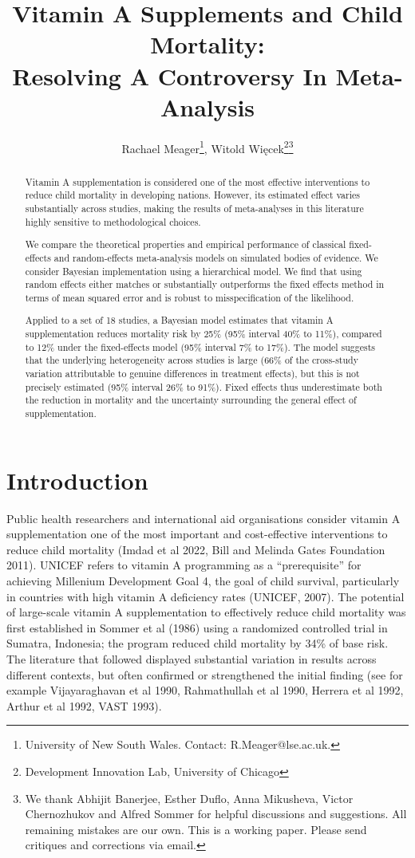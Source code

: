 \documentclass[12pt]{article}
\title{\Large Vitamin A Supplements and Child Mortality:\\ Resolving A Controversy In Meta-Analysis\\
}
\author{Rachael Meager\footnote{University of New South Wales. Contact: R.Meager@lse.ac.uk.}, Witold Więcek\footnote{Development Innovation Lab, University of Chicago}\;\thanks{We thank Abhijit Banerjee, Esther Duflo, Anna Mikusheva, Victor Chernozhukov and Alfred Sommer for helpful discussions and suggestions. All remaining mistakes are our own. This is a working paper. Please send critiques and corrections via email.  }}
\begin{document}
\maketitle

\begin{abstract}
Vitamin A supplementation is considered one of the most effective interventions to reduce child mortality in developing nations. However, its estimated effect varies substantially across studies, making the results of meta-analyses in this literature highly sensitive to methodological choices. 

We compare the theoretical properties and empirical performance of classical fixed-effects and  random-effects meta-analysis models on simulated bodies of evidence. We consider Bayesian implementation using a hierarchical model. We find that using random effects either matches or substantially outperforms the fixed effects method in terms of mean squared error and is robust to misspecification of the likelihood. 

Applied to a set of 18 studies, a Bayesian model estimates that vitamin A supplementation reduces mortality risk by 25\% (95\% interval 40\% to 11\%), compared to 12\% under the fixed-effects model (95\% interval 7\% to 17\%). 
The model suggests that the underlying heterogeneity across studies is large (66\% of the cross-study variation attributable to genuine differences in treatment effects), but this is not precisely estimated (95\% interval 26\% to 91\%).
Fixed effects thus underestimate both the reduction in mortality and the uncertainty surrounding the general effect of supplementation. 

\end{abstract}

\section{Introduction}
Public health researchers and international aid organisations consider vitamin A supplementation one of the most important and cost-effective interventions to reduce child mortality (Imdad et al 2022, Bill and Melinda Gates Foundation 2011). UNICEF refers to vitamin A programming as a ``prerequisite'' for achieving Millenium Development Goal 4, the goal of child survival, particularly in countries with high vitamin A deficiency rates (UNICEF, 2007).  The potential of large-scale vitamin A supplementation to effectively reduce child mortality was first established in Sommer et al (1986) using a randomized controlled trial in Sumatra, Indonesia; the program reduced child mortality by 34\% of base risk. The literature that followed displayed substantial variation in results across different contexts, but often confirmed or strengthened the initial finding (see for example Vijayaraghavan et al 1990, Rahmathullah et al 1990, Herrera et al 1992, Arthur et al 1992, VAST 1993). 
\end{document}
